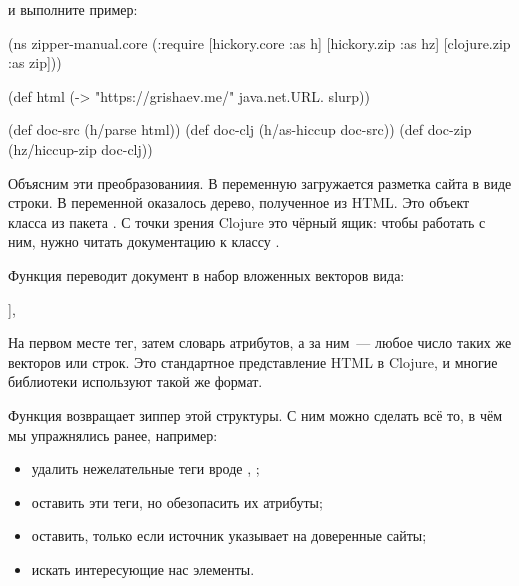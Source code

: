 \begin{english}
  \begin{clojure}
[hickory "0.7.1"]
  \end{clojure}
\end{english}

и выполните пример:

\begin{english}
  \begin{clojure}
(ns zipper-manual.core
  (:require
   [hickory.core :as h]
   [hickory.zip :as hz]
   [clojure.zip :as zip]))

(def html (-> "https://grishaev.me/"
              java.net.URL.
              slurp))

(def doc-src (h/parse html))
(def doc-clj (h/as-hiccup doc-src))
(def doc-zip (hz/hiccup-zip doc-clj))
  \end{clojure}
\end{english}

Объясним эти преобразованиия. В переменную  загружается разметка сайта в
виде строки. В переменной  оказалось дерево, полученное из HTML. Это
объект класса  из пакета . С точки зрения Clojure это
чёрный ящик: чтобы работать с ним, нужно читать документацию к классу
.

Функция  переводит документ в набор вложенных векторов вида:

\begin{english}
  \begin{clojure}
[:tag {:attr "value"} & [...]],
  \end{clojure}
\end{english}

На первом месте тег, затем словарь атрибутов, а за ним~--- любое число таких же
векторов или строк. Это стандартное представление HTML в Clojure, и многие
библиотеки используют такой же формат.

Функция  возвращает зиппер этой структуры. С ним можно сделать всё
то, в чём мы упражнялись ранее, например:

\begin{itemize}

\item
  удалить нежелательные теги вроде , ;

\item
  оставить эти теги, но обезопасить их атрибуты;

\item
  оставить, только если источник указывает на доверенные сайты;

\item
  искать интересующие нас элементы.

\end{itemize}

